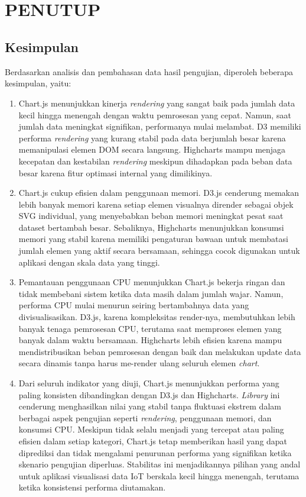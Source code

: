 \chapter[PENUTUP]{\\PENUTUP}

\section{Kesimpulan}
Berdasarkan analisis dan pembahasan data hasil pengujian, diperoleh beberapa kesimpulan, yaitu:
\begin{enumerate}
    \item Chart.js menunjukkan kinerja \textit{rendering} yang sangat baik pada jumlah data kecil hingga menengah dengan waktu pemrosesan yang cepat. Namun, saat jumlah data meningkat signifikan, performanya mulai melambat. D3 memiliki performa \textit{rendering} yang kurang stabil pada data berjumlah besar karena memanipulasi elemen DOM secara langsung. Highcharts mampu menjaga kecepatan dan kestabilan \textit{rendering} meskipun dihadapkan pada beban data besar karena fitur optimasi internal yang dimilikinya.
    \item Chart.js cukup efisien dalam penggunaan memori. D3.js cenderung memakan lebih banyak memori karena setiap elemen visualnya dirender sebagai objek SVG individual, yang menyebabkan beban memori meningkat pesat saat dataset bertambah besar. Sebaliknya, Highcharts menunjukkan konsumsi memori yang stabil karena memiliki pengaturan bawaan untuk membatasi jumlah elemen yang aktif secara bersamaan, sehingga cocok digunakan untuk aplikasi dengan skala data yang tinggi.
    \item Pemantauan penggunaan CPU menunjukkan Chart.js bekerja ringan dan tidak membebani sistem ketika data masih dalam jumlah wajar. Namun, performa CPU mulai menurun seiring bertambahnya data yang divisualisasikan. D3.js, karena kompleksitas render-nya, membutuhkan lebih banyak tenaga pemrosesan CPU, terutama saat memproses elemen yang banyak dalam waktu bersamaan. Highcharts lebih efisien karena mampu mendistribusikan beban pemrosesan dengan baik dan melakukan update data secara dinamis tanpa harus me-render ulang seluruh elemen \textit{chart}.
    \item Dari seluruh indikator yang diuji, Chart.js menunjukkan performa yang paling konsisten dibandingkan dengan D3.js dan Highcharts. \textit{Library} ini cenderung menghasilkan nilai yang stabil tanpa fluktuasi ekstrem dalam berbagai aspek pengujian seperti \textit{rendering}, penggunaan memori, dan konsumsi CPU. Meskipun tidak selalu menjadi yang tercepat atau paling efisien dalam setiap kategori, Chart.js tetap memberikan hasil yang dapat diprediksi dan tidak mengalami penurunan performa yang signifikan ketika skenario pengujian diperluas. Stabilitas ini menjadikannya pilihan yang andal untuk aplikasi visualisasi data IoT berskala kecil hingga menengah, terutama ketika konsistensi performa diutamakan. 
\end{enumerate}

